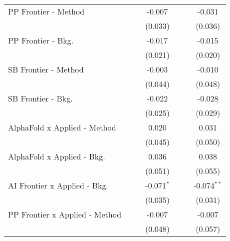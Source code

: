 \begin{tabular}{lcccccc}
   PP Frontier - Method           &                &              & -0.007         &                &              & -0.031\\   
                                  &                &              & (0.033)        &                &              & (0.036)\\   
   PP Frontier - Bkg.             &                &              & -0.017         &                &              & -0.015\\   
                                  &                &              & (0.021)        &                &              & (0.020)\\   
   SB Frontier - Method           &                &              & -0.003         &                &              & -0.010\\   
                                  &                &              & (0.044)        &                &              & (0.048)\\   
   SB Frontier - Bkg.             &                &              & -0.022         &                &              & -0.028\\   
                                  &                &              & (0.025)        &                &              & (0.029)\\   
   AlphaFold x Applied - Method   &                &              & 0.020          &                &              & 0.031\\   
                                  &                &              & (0.045)        &                &              & (0.050)\\   
   AlphaFold x Applied - Bkg.     &                &              & 0.036          &                &              & 0.038\\   
                                  &                &              & (0.051)        &                &              & (0.055)\\   
   AI Frontier x Applied - Bkg.   &                &              & -0.071$^{*}$   &                &              & -0.074$^{**}$\\   
                                  &                &              & (0.035)        &                &              & (0.031)\\   
   PP Frontier x Applied - Method &                &              & -0.007         &                &              & -0.007\\   
                                  &                &              & (0.048)        &                &              & (0.057)\\   

\end{tabular}
